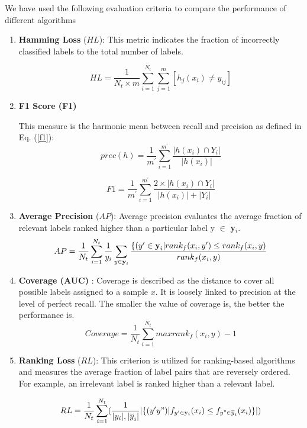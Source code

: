 \documentclass[12pt,a4paper,oneside,english]{report}
\begin{document}
We have used the following evaluation criteria to compare the performance of different algorithms
\begin{enumerate}
	\item \textbf{Hamming Loss} ($HL$): This metric indicates the fraction of incorrectly classified labels to the total number of labels.

	\begin{equation}
	HL = \dfrac{1}{N_{t} \times m} \sum_{i=1}^{N_{t}} \sum_{j=1}^{m} [h_{j}(x_{i})\neq y_{ij}]
	\end{equation}


\item \textbf{F1 Score (F1)} 

\hspace{1cm}This measure is the harmonic mean between recall and precision as defined in Eq. (\ref{f1}):
\begin{equation}
    prec(h)=\frac{1}{m^{'}}\sum_{i=1}^{m^{'}}\frac{ |h(x_i) \cap Y_i|}{|h(x_i)|}
\end{equation}

\begin{equation}\label{f1}
    F1=\frac{1}{m^{'}}\sum_{i=1}^{m^{'}}\frac{2 \times |h(x_i) \cap Y_i|}{|h(x_i)| + |Y_i|}
\end{equation}
	\item \textbf{Average Precision} ($AP$): Average precision evaluates the average fraction of relevant labels ranked higher than a particular label y $\in$ \textbf{y}$_{i}$. 
	\begin{equation}
	AP = \dfrac{1}{N_{t}} \\ \sum_{i=1}^{N_{t}} \dfrac{1}{y_{i}} \sum_{y \in \textbf{y}_{i}} \dfrac{\lbrace(y' \in \textbf{y}_{i} |rank_{f} (x_{i},y') \leq rank_{f}(x_{i},y)}{rank_{f}(x_{i},y)}
	\end{equation}
	\item \textbf{Coverage (AUC)} : Coverage is described as the distance to cover all possible labels assigned to a sample $x$. It is loosely linked to precision at the level of perfect recall. The smaller the value of coverage is, the better the performance is.
	\begin{equation}
    Coverage = \dfrac{1}{N_{t}} \sum_{i=1}^{N_{t}} max {rank_{f}(x_{i},y)-1}
	\end{equation}
	
    \item \textbf{Ranking Loss} ($RL$): This criterion is utilized for ranking-based algorithms and measures the average fraction of label pairs that are reversely ordered. For example, an irrelevant label is ranked higher than a relevant label.
    
    \begin{equation}RL=\frac{1}{N_{t}}\sum_{i=1}^{N_{t}}(\frac{1}{|y_{i}|,|\overline{y}_{i}|}|\{(y'y")|f_{y'\in \mathrm{y}_{i}}(x_{i})\leq f_{y"\in\overline{y}_{i}}(x_{i})\}|)
    \end{equation}

\end{enumerate}
\end{document}

